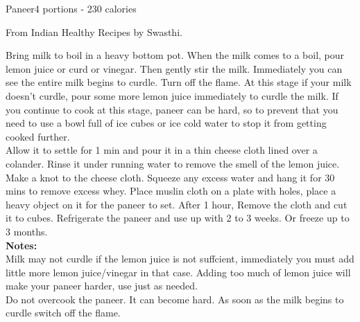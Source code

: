 \begin{recipe}{Paneer}{4 portions - 230 calories}{}

    \freeform From Indian Healthy Recipes by Swasthi.


    Bring milk to boil in a heavy bottom pot. When the milk comes to a boil, pour lemon juice or curd or vinegar. Then gently stir the milk. Immediately you can see the entire milk begins to curdle. Turn off the flame. At this stage if your milk doesn't curdle, pour some more lemon juice immediately to curdle the milk. If you continue to cook at this stage, paneer can be hard, so to prevent that you need to use a bowl full of ice cubes or ice cold water to stop it from getting cooked further.\\

    Allow it to settle for 1 min and pour it in a thin cheese cloth lined over a colander. Rinse it under running water to remove the smell of the lemon juice.\\

    Make a knot to the cheese cloth. Squeeze any excess water and hang it for 30 mins to remove excess whey. Place muslin cloth on a plate with holes, place a heavy object on it for the paneer to set. After 1 hour, Remove the cloth and cut it to cubes. Refrigerate the paneer and use up with 2 to 3 weeks. Or freeze up to 3 months.\\

    \textbf{Notes:}\\

    Milk may not curdle if the lemon juice is not suffcient, immediately you must add little more lemon juice/vinegar in that case. Adding too much of lemon juice will make your paneer harder, use just as needed.\\

    Do not overcook the paneer. It can become hard. As soon as the milk begins to curdle switch off the flame.

\end{recipe}